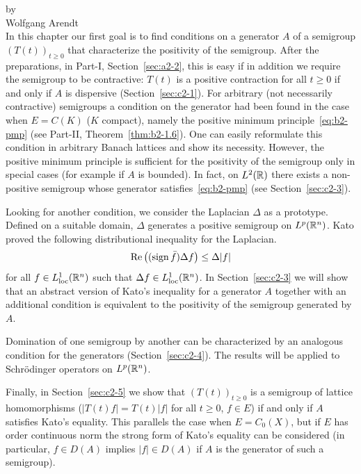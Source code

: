\label{chap:c2}
\thispagestyle{empty}%
{\Large
\vspace*{-.75cm}
by \\[.25em]
Wolfgang Arendt
\vspace{.75cm}
\\
}
In this chapter our first goal is to find conditions on a generator $A$ of a semigroup $(T(t))_{t \geq 0}$ that characterize the positivity of the semigroup. After the preparations, in Part-I, Section~\ref{sec:a2-2}, this is easy if in addition we require the semigroup to be contractive: $T(t)$ is a positive contraction for all $t \geq 0$ if and only if $A$ is dispersive (Section~\ref{sec:c2-1}). 
For arbitrary (not necessarily contractive) semigroups a condition on the generator had been found in the case when $E = C(K)$ ($K$ compact), namely the positive minimum principle~\eqref{eq:b2-pmp} (see Part-II, Theorem~\ref{thm:b2-1.6}). 
One can easily reformulate this condition in arbitrary Banach lattices and show its necessity. 
However, the positive minimum principle is sufficient for the positivity of the semigroup only in special cases (for example if\/ $A$ is bounded). 
In fact, on $L^{2}(\mathbb{R})$ there exists a non-positive semigroup whose generator satisfies~\eqref{eq:b2-pmp} (see Section~\ref{sec:c2-3}).

Looking for another condition, we consider the Laplacian $\Delta$ as a prototype.
Defined on a suitable domain, $\Delta$ generates a positive semigroup on $L^p(\mathbb{R}^n)$.
Kato proved the following distributional inequality for the Laplacian.
\[
\Re \left( (\sign \bar{f}) \Delta f \right) \leq \Delta|f|
\]
for all $f \in L^1_{\text{loc}}(\mathbb{R}^{n})$ such that $\Delta f \in L^1_{\text{loc}}(\mathbb{R}^{n})$.
In Section~\ref{sec:c2-3} we will show that an abstract version of Kato's inequality for a generator $A$ together with an additional condition is equivalent to the positivity of the semigroup generated by $A$.

Domination of one semigroup by another can be characterized by an analogous condition for the generators (Section~\ref{sec:c2-4}).
The results will be applied to Schrödinger operators on $L^p(\mathbb{R}^n)$.

Finally, in Section~\ref{sec:c2-5} we show that $(T(t))_{t \geq 0}$ is a semigroup of lattice homomorphisms (\ie $|T(t) f| = T(t) |f|$ for all $t \geq 0$, $f \in E$) if and only if\/ $A$ satisfies Kato's equality.
This parallels the case when $E = C_{0}(X)$, but if\/ $E$ has order continuous norm the strong form of Kato's equality can be considered (in particular, $f \in D(A)$ implies $|f| \in D(A)$ if\/ $A$ is the generator of such a semigroup).
